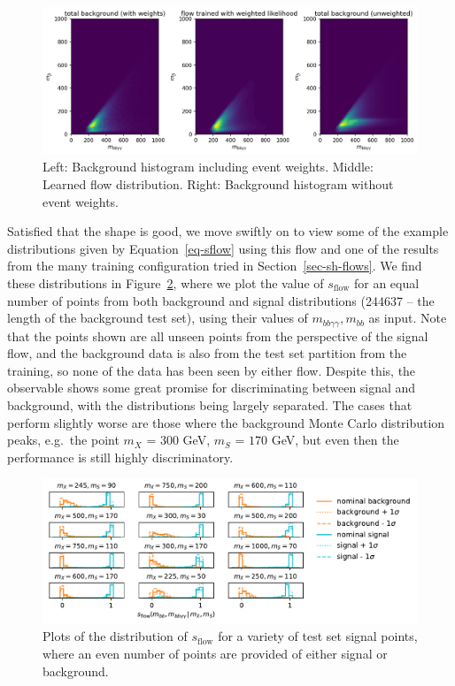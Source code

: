 \documentclass[
  11pt,
  numbers=noendperiod]{book}
\begin{document}
\begin{figure}

{\centering \includegraphics{./images/sh/flowvsbkg.png}

}

\caption{\label{fig-flow-vs-bkg}Left: Background histogram including
event weights. Middle: Learned flow distribution. Right: Background
histogram without event weights.}

\end{figure}

Satisfied that the shape is good, we move swiftly on to view some of the
example distributions given by Equation~\ref{eq-sflow} using this flow
and one of the results from the many training configuration tried in
Section~\ref{sec-sh-flows}. We find these distributions in
Figure~\ref{fig-sflow-shapes}, where we plot the value of
\(s_{\text{flow}}\) for an equal number of points from both background
and signal distributions (244637 -- the length of the background test
set), using their values of \(m_{bb\gamma\gamma}, m_{bb}\) as input.
Note that the points shown are all unseen points from the perspective of
the signal flow, and the background data is also from the test set
partition from the training, so none of the data has been seen by either
flow. Despite this, the observable shows some great promise for
discriminating between signal and background, with the distributions
being largely separated. The cases that perform slightly worse are those
where the background Monte Carlo distribution peaks, e.g.~the point
\(m_X\) = $300$ GeV, \(m_S\) = $170$ GeV, but even then the performance is
still highly discriminatory.

\begin{figure}

{\centering \includegraphics{./images/sh/conditioned_sflow_all.pdf}

}

\caption{\label{fig-sflow-shapes}Plots of the distribution of
\(s_{\text{flow}}\) for a variety of test set signal points, where an
even number of points are provided of either signal or background.}

\end{figure}
\end{document}
